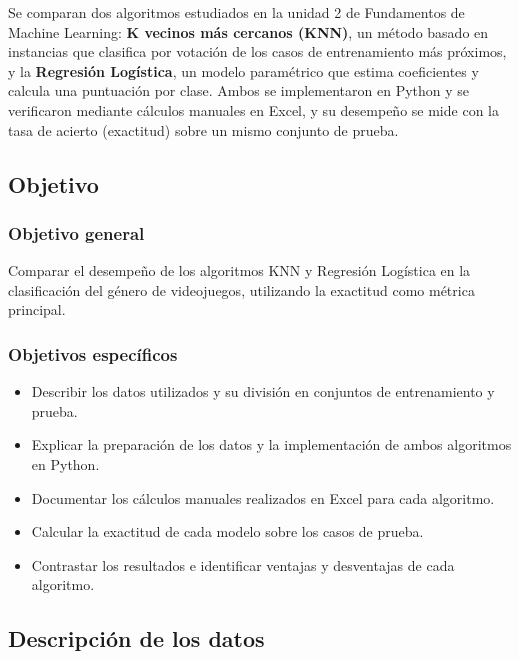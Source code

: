 \documentclass[]{article}
\begin{document}
Se comparan dos algoritmos estudiados en la unidad 2 de Fundamentos de Machine Learning: \textbf{K vecinos más cercanos (KNN)}, un método basado en instancias que clasifica por votación de los casos de entrenamiento más próximos, y la \textbf{Regresión Logística}, un modelo paramétrico que estima coeficientes y calcula una puntuación por clase. Ambos se implementaron en Python y se verificaron mediante cálculos manuales en Excel, y su desempeño se mide con la tasa de acierto (exactitud) sobre un mismo conjunto de prueba.

\subsection{Objetivo}

\subsubsection{Objetivo general}
Comparar el desempeño de los algoritmos KNN y Regresión Logística en la clasificación del género de videojuegos, utilizando la exactitud como métrica principal.

\subsubsection{Objetivos específicos}
\begin{itemize}[nosep]
  \item Describir los datos utilizados y su división en conjuntos de entrenamiento y prueba.
  \item Explicar la preparación de los datos y la implementación de ambos algoritmos en Python.
  \item Documentar los cálculos manuales realizados en Excel para cada algoritmo.
  \item Calcular la exactitud de cada modelo sobre los casos de prueba.
  \item Contrastar los resultados e identificar ventajas y desventajas de cada algoritmo.
\end{itemize}

\subsection{Descripción de los datos}
\end{document}
